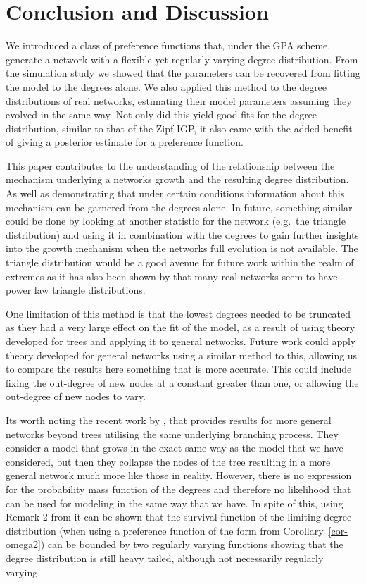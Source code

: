 \documentclass[
  sn-basic,
  10pt,
]{sn-jnl}
\theoremstyle{plain}
\theoremstyle{plain}
\theoremstyle{remark}
\begin{document}
\section{Conclusion and Discussion}\label{sec-conc}

We introduced a class of preference functions that, under the GPA
scheme, generate a network with a flexible yet regularly varying degree
distribution. From the simulation study we showed that the parameters
can be recovered from fitting the model to the degrees alone. We also
applied this method to the degree distributions of real networks,
estimating their model parameters assuming they evolved in the same way.
Not only did this yield good fits for the degree distribution, similar
to that of the Zipf-IGP, it also came with the added benefit of giving a
posterior estimate for a preference function.

This paper contributes to the understanding of the relationship between
the mechanism underlying a networks growth and the resulting degree
distribution. As well as demonstrating that under certain conditions
information about this mechanism can be garnered from the degrees alone.
In future, something similar could be done by looking at another
statistic for the network (e.g.~the triangle distribution) and using it
in combination with the degrees to gain further insights into the growth
mechanism when the networks full evolution is not available. The
triangle distribution would be a good avenue for future work within the
realm of extremes as it has also been shown by \citet{kang11} that many
real networks seem to have power law triangle distributions.

One limitation of this method is that the lowest degrees needed to be
truncated as they had a very large effect on the fit of the model, as a
result of using theory developed for trees and applying it to general
networks. Future work could apply theory developed for general networks
using a similar method to this, allowing us to compare the results here
something that is more accurate. This could include fixing the
out-degree of new nodes at a constant greater than one, or allowing the
out-degree of new nodes to vary.

Its worth noting the recent work by \citet{banerjee25}, that provides
results for more general networks beyond trees utilising the same
underlying branching process. They consider a model that grows in the
exact same way as the model that we have considered, but then they
collapse the nodes of the tree resulting in a more general network much
more like those in reality. However, there is no expression for the
probability mass function of the degrees and therefore no likelihood
that can be used for modeling in the same way that we have. In spite of
this, using Remark 2 from \citet{banerjee25} it can be shown that the
survival function of the limiting degree distribution (when using a
preference function of the form from Corollary~\ref{cor-omega2}) can be
bounded by two regularly varying functions showing that the degree
distribution is still heavy tailed, although not necessarily regularly
varying.
\end{document}
